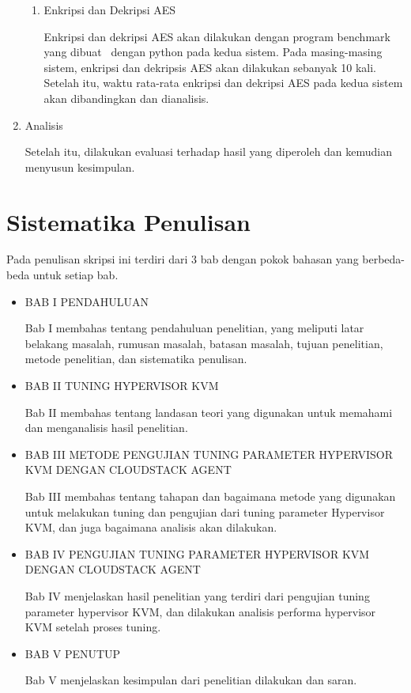 \begin{enumerate}
\begin{enumerate}
                  \item Enkripsi dan Dekripsi AES

                        Enkripsi dan dekripsi AES akan dilakukan dengan program benchmark yang dibuat \saya\ dengan python pada kedua sistem. Pada masing-masing sistem, enkripsi dan dekripsis AES akan dilakukan sebanyak 10 kali. Setelah itu, waktu rata-rata enkripsi dan dekripsi AES pada kedua sistem akan dibandingkan dan dianalisis.
            \end{enumerate}

      \item Analisis

            Setelah itu, dilakukan evaluasi terhadap hasil yang diperoleh dan kemudian menyusun kesimpulan.
\end{enumerate}


\section{Sistematika Penulisan}
Pada penulisan skripsi ini terdiri dari 3 bab dengan pokok bahasan yang berbeda-beda untuk setiap bab.
\begin{itemize}
      \item BAB I PENDAHULUAN

            Bab I membahas tentang pendahuluan penelitian, yang meliputi latar belakang masalah, rumusan masalah, batasan masalah, tujuan penelitian, metode penelitian, dan sistematika penulisan.

      \item BAB II TUNING HYPERVISOR KVM

            Bab II membahas tentang landasan teori yang digunakan untuk memahami dan menganalisis hasil penelitian.

      \item BAB III METODE PENGUJIAN TUNING PARAMETER HYPERVISOR KVM DENGAN CLOUDSTACK AGENT

            Bab III membahas tentang tahapan dan bagaimana metode yang digunakan untuk melakukan tuning dan pengujian dari tuning parameter Hypervisor KVM, dan juga bagaimana analisis akan dilakukan.

      \item BAB IV PENGUJIAN TUNING PARAMETER HYPERVISOR KVM DENGAN CLOUDSTACK AGENT

            Bab IV menjelaskan hasil penelitian yang terdiri dari pengujian tuning parameter hypervisor KVM, dan dilakukan analisis performa hypervisor KVM setelah proses tuning.

      \item BAB V PENUTUP

            Bab V menjelaskan kesimpulan dari penelitian dilakukan dan saran.
\end{itemize}